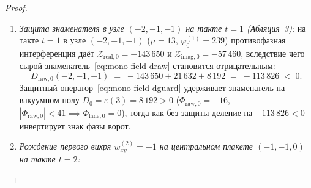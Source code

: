 \begin{proof}
\begin{enumerate}[label=\textbf{\arabic*.},leftmargin=*]
  при переходе через плоскость $z = 0 \leftrightarrow z = -1$ знак координаты~$z$ меняется, переводя октант $\mathrm{oct}(0,2,2) = 7$ ($b_1 = 1$) в октант $\mathrm{oct}(-1,2,2) = 3$ ($b_1 = 0$):
  \begin{align*}
    \varphi_1^{(0)}(0,2,2) &= 41, \qquad
    \varphi_1^{(0)}(-1,2,2) \;=\; 164, \\
    \mathcal{Z}_{\mathrm{real},1}(0,2,2) &= \mathcal{Z}_{\mathrm{real},1}(-1,2,2) \;=\; 134\,862, \qquad
    D_1 \;=\; 164\,686, \\
    \mathcal{Z}_{\mathrm{imag},1}(\pm) &= \pm 70\,980, \qquad
    64\,z_{\mathrm{drive},1}(\pm) \;=\; \pm 12\,524\,928.
  \end{align*}
  Поскольку $12\,524\,928 = 76 \times 164\,686 + 8\,792$ с ненулевым остатком $8\,792 > 0$, деление с округлением вниз (\texttt{fdiv}) даёт:
  \begin{align*}
    \Phi_{\mathrm{field}}^{(0)}(0,2,2) &= \left\lfloor \frac{+12\,524\,928}{164\,686} \right\rfloor \;=\; +76, \\
    \Phi_{\mathrm{field}}^{(0)}(-1,2,2) &= \left\lfloor \frac{-12\,524\,928}{164\,686} \right\rfloor \;=\; -77,
  \end{align*}
  откуда $\Phi_{\mathrm{field}}^{(0)}(0,2,2) + \Phi_{\mathrm{field}}^{(0)}(-1,2,2) = 76 - 77 = -1 \ne 0$. При замене \texttt{fdiv} на усечение к нулю \texttt{tdiv} (\texttt{ablation\_\allowbreak tdiv\_\allowbreak destroys\_\allowbreak domain\_\allowbreak wall\_\allowbreak chiral\_\allowbreak asymmetry}) отрицательное частное становится равным $-76$, и киральная сумма обращается в $76 + (-76) = 0$.
\item \emph{Защита знаменателя в узле $(-2, -1, -1)$ на такте $t = 1$ (Абляция~3):}
  на такте $t = 1$ в узле $(-2,-1,-1)$ ($\mu = 13$, $\varphi_0^{(1)} = 239$) противофазная интерференция даёт $\mathcal{Z}_{\mathrm{real},0} = -143\,650$ и $\mathcal{Z}_{\mathrm{imag},0} = -57\,460$, вследствие чего сырой знаменатель~\eqref{eq:mono-field-draw} становится отрицательным:
  \[
    D_{\mathrm{raw},0}(-2,-1,-1) \;=\; -143\,650 + 21\,632 + 8\,192 \;=\; -113\,826 \;<\; 0.
  \]
  Защитный оператор~\eqref{eq:mono-field-dguard} удерживает знаменатель на вакуумном полу $D_0 = \varepsilon(3) = 8\,192 > 0$ ($\Phi_{\mathrm{raw},0} = -16$, $|\Phi_{\mathrm{raw},0}| < 41 \implies \Phi_{\mathrm{lane},0} = 0$), тогда как без защиты деление на $-113\,826 < 0$ инвертирует знак фазы ворот.
\item \emph{Рождение первого вихря $w_{xy}^{(2)} = +1$ на центральном плакете $(-1,-1,0)$ на такте $t = 2$:}

\end{enumerate}
\end{proof}
